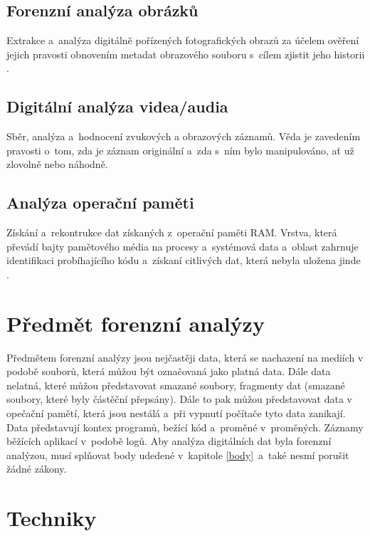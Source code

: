 \documentclass[thesis=B,czech]{FITthesis}[2012/06/26]
\begin{document}
\subsection{Forenzní analýza obrázků}
Extrakce a~analýza digitálně pořízených fotografických obrazů za účelem ověření jejich pravosti obnovením metadat obrazového souboru s~cílem zjistit jeho historii \cite{for_types}.

\subsection{Digitální analýza videa/audia}
Sběr, analýza a~hodnocení zvukových a obrazových záznamů. Věda je zavedením pravosti o~tom, zda je záznam originální a~zda s~ním bylo manipulováno, ať už zlovolně nebo náhodně.

\subsection{Analýza operační paměti}
Získání a~rekontrukce dat získaných z~operační paměti RAM. Vrstva, která převádí bajty pamětového média na procesy a~systémová data a~oblast zahrnuje identifikaci probíhajícího kódu a~získaní citlivých dat, která nebyla uložena jinde \cite{carrier2003defining}. 




\section{Předmět forenzní analýzy}

Předmětem forenzní analýzy jsou nejčastěji data, která se nachazení na mediích v podobě souborů, která můžou být označovaná jako platná data. Dále data nelatná, které můžou představovat smazané soubory, fragmenty dat (smazané soubory, které byly částěční přepsány). Dále to pak můžou představovat data v opečační pamětí, která jsou nestálá a~při vypnutí počítače tyto data zanikají. Data představují kontex programů, bežící kód a~proměné v~proměných. Záznamy běžících aplikací v~podobě logů. 
Aby analýza digitálních dat byla forenzní analýzou, musí splňovat body udedené v~kapitole \ref{body}~a~také nesmí porušit žádné zákony.



\section{Techniky}
\end{document}
